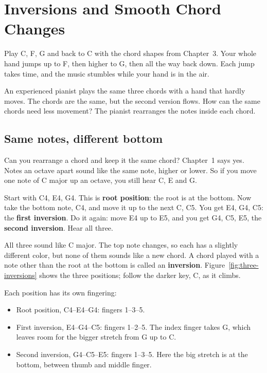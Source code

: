 \chapter{Inversions and Smooth Chord Changes}
\label{ch:inversions-and-voice-leading}
\chapterline

Play C, F, G and back to C with the chord shapes from Chapter~3. Your whole hand jumps up to F, then higher to G, then all the way back down.  Each jump takes time, and the music stumbles while your hand is in the air.

An experienced pianist plays the same three chords with a hand that hardly moves.  The chords are the same, but the second version flows. How can the same chords need less movement? The pianist rearranges the notes inside each chord.

\section{Same notes, different bottom}

Can you rearrange a chord and keep it the same chord? Chapter~1 says yes. Notes an octave apart sound like the same note, higher or lower. So if you move one note of C major up an octave, you still hear C, E and G.

Start with C4, E4, G4. This is \textbf{root position}: the root is at the bottom. Now take the bottom note, C4, and move it up to the next C, C5. You get E4, G4, C5: the \textbf{first inversion}. Do it again: move E4 up to E5, and you get G4, C5, E5, the \textbf{second inversion}. Hear all three. 

All three sound like C major. The top note changes, so each has a slightly different color, but none of them sounds like a new chord. A chord played with a note other than the root at the bottom is called an \textbf{inversion}. Figure~\ref{fig:three-inversions} shows the three positions; follow the darker key, C, as it climbs.

Each position has its own fingering:
\begin{itemize}
  \item Root position, C4--E4--G4: fingers 1--3--5. 
  \item First inversion, E4--G4--C5: fingers 1--2--5. The index finger takes G, which leaves room for the bigger stretch from G up to C. 
  \item Second inversion, G4--C5--E5: fingers 1--3--5. Here the big stretch is at the bottom, between thumb and middle finger. 
\end{itemize}

